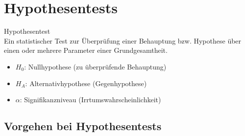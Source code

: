 \section{Hypothesentests}

\begin{definition}{Hypothesentest}\\
Ein statistischer Test zur Überprüfung einer Behauptung bzw. Hypothese über einen oder mehrere Parameter einer Grundgesamtheit.

\begin{itemize}
  \item $H_0$: Nullhypothese (zu überprüfende Behauptung)
  \item $H_A$: Alternativhypothese (Gegenhypothese)
  \item $\alpha$: Signifikanzniveau (Irrtumswahrscheinlichkeit)
\end{itemize}
\end{definition}

\subsection{Vorgehen bei Hypothesentests}

